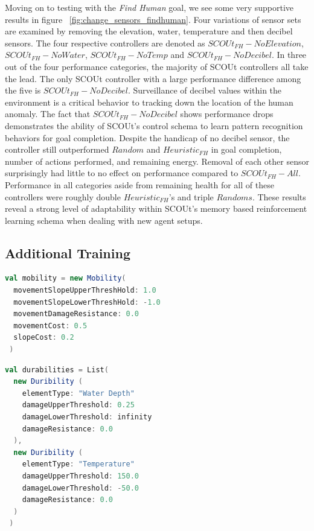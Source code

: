 
Moving on to testing with the \textit{Find Human} goal, we see some very supportive results in figure ~\ref{fig:change_sensors_findhuman}.
Four variations of sensor sets are examined by removing the elevation, water, temperature and then decibel sensors.
The four respective controllers are denoted as $SCOUt_{FH} - No Elevation$, $SCOUt_{FH} - No Water$, $SCOUt_{FH} - No Temp$ and $SCOUt_{FH} - No Decibel$.
In three out of the four performance categories, the majority of SCOUt controllers all take the lead.
The only SCOUt controller with a large performance difference among the five is $SCOUt_{FH} - No Decibel$.
Surveillance of decibel values within the environment is a critical behavior to tracking down the location of the human anomaly.
The fact that $SCOUt_{FH} - No Decibel$ shows performance drops demonstrates the ability of SCOUt's control schema to learn pattern recognition behaviors for goal completion.
Despite the handicap of no decibel sensor, the controller still outperformed $Random$ and $Heuristic_{FH}$ in goal completion, number of actions performed, and remaining energy.
Removal of each other sensor surprisingly had little to no effect on performance compared to $SCOUt_{FH} - All$.
Performance in all categories aside from remaining health for all of these controllers were roughly double $Heuristic_{FH}$'s and triple $Randoms$.
These results reveal a strong level of adaptability within SCOUt's memory based reinforcement learning schema when dealing with new agent setups.



\subsection{Additional Training}






\begin{lstlisting}[language=Scala]
 val mobility = new Mobility(
  movementSlopeUpperThreshHold: 1.0
  movementSlopeLowerThreshHold: -1.0
  movementDamageResistance: 0.0
  movementCost: 0.5
  slopeCost: 0.2
 )
\end{lstlisting}

\begin{lstlisting}[language=Scala]
 val durabilities = List(
  new Duribility (
    elementType: "Water Depth"
    damageUpperThreshold: 0.25
    damageLowerThreshold: infinity
    damageResistance: 0.0
  ),
  new Duribility (
    elementType: "Temperature"
    damageUpperThreshold: 150.0
    damageLowerThreshold: -50.0
    damageResistance: 0.0
  )
 )
\end{lstlisting}


